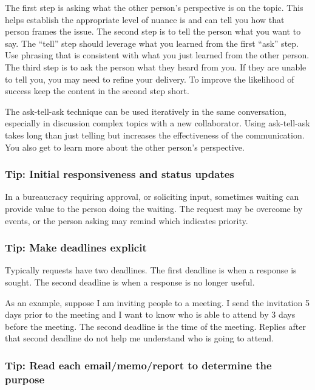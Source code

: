 The first step is asking what the other person's perspective is on the topic. This helps establish the appropriate level of nuance is and can tell you how that person frames the issue. The second step is to tell the person what you want to say. The ``tell'' step should leverage what you learned from the first ``ask'' step. Use phrasing that is consistent with what you just learned from the other person. The third step is to ask the person what they heard from you. If they are unable to tell you, you may need to refine your delivery. To improve the likelihood of success keep the content in the second step short. 

The ask-tell-ask technique can be used iteratively in the same conversation, especially in discussion complex topics with a new collaborator. Using ask-tell-ask takes long than just telling but increases the effectiveness of the communication. You also get to learn more about the other person's perspective. 


\subsubsection{Tip: Initial responsiveness and status updates}
In a bureaucracy requiring approval, or soliciting input, sometimes waiting can provide value to the person doing the waiting. The request may be overcome by events, or the person asking may remind which indicates priority.

\subsubsection{Tip: Make deadlines explicit}

Typically requests have two deadlines. The first deadline is when a response is sought. The second deadline is when a response is no longer useful.  

As an example, suppose I am inviting people to a meeting. I send the invitation 5 days prior to the meeting and I want to know who is able to attend by 3 days before the meeting. The second deadline is the time of the meeting. Replies after that second deadline do not help me understand who is going to attend. 

\subsubsection{Tip: Read each email/memo/report to determine the purpose }

